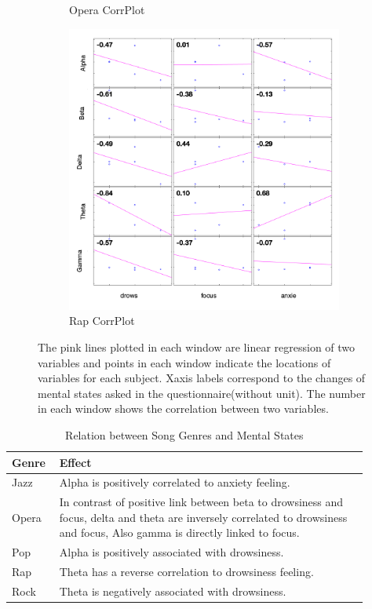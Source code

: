 \documentclass[9pt,twocolumn]{paper-template}
\begin{document}
\begin{figure}[!htbp]
\begin{subfigure}[b]{0.4\linewidth}
    \caption{Opera CorrPlot}
  \end{subfigure}
   \begin{subfigure}[b]{0.4\linewidth}
    \includegraphics[width=\linewidth]{figures/rap_corrplot.png}
    \caption{Rap CorrPlot}
  \end{subfigure}
  \caption{The pink lines plotted in each window are linear regression of two variables and points in each window indicate the locations of variables for each subject. Xaxis labels correspond to the changes of mental states asked in the questionnaire(without unit). The number in each window shows the correlation between two variables.
}
  \label{fig:Corrplot}
\end{figure}

\begin{table}[ht]
\raggedleft
  \caption{Relation between Song Genres and Mental States}
\label{table:result1}
\begin{tabular}{p{0.1\linewidth}|p{0.8\linewidth}}
  \textbf{Genre} & \textbf{Effect} \\
\hline
Jazz& Alpha is positively correlated to anxiety feeling.\\
Opera&In contrast of positive link between beta to drowsiness and focus, delta and theta are inversely correlated to drowsiness and focus, Also gamma is directly linked to focus.\\
Pop &Alpha is positively associated with drowsiness.\\
Rap &Theta has a reverse correlation to drowsiness feeling.\\
Rock &Theta is negatively associated with drowsiness.\\
\end{tabular}
\end{table}
\end{document}

